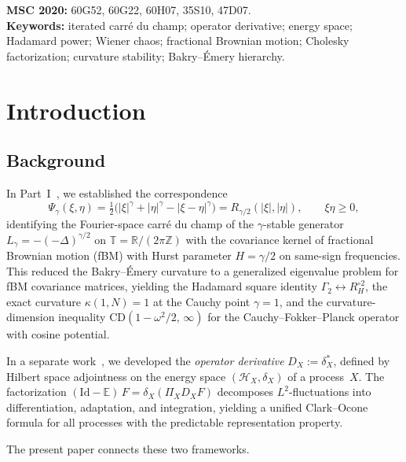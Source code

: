 \documentclass[11pt,a4paper]{article}
\theoremstyle{plain}
\theoremstyle{definition}
\theoremstyle{remark}
\newcommand{\E}{\mathbb{E}}
\newcommand{\R}{\mathbb{R}}
\newcommand{\Z}{\mathbb{Z}}
\newcommand{\T}{\mathbb{T}}
\newcommand{\Id}{\mathrm{Id}}
\begin{document}
\medskip
\noindent\textbf{MSC 2020:} 60G52, 60G22, 60H07, 35S10, 47D07.\\
\textbf{Keywords:} iterated carr\'e du champ; operator derivative;
energy space; Hadamard power; Wiener chaos;
fractional Brownian motion; Cholesky factorization;
curvature stability; Bakry--\'Emery hierarchy.


\section{Introduction}\label{sec:intro}

\subsection{Background}

In Part~I~\cite{Fontes2026b}, we established the correspondence
\begin{equation}\label{eq:part1-duality}
  \Psi_\gamma(\xi,\eta)
  = \tfrac{1}{2}\bigl(|\xi|^\gamma + |\eta|^\gamma
    - |\xi - \eta|^\gamma\bigr)
  = R_{\gamma/2}(|\xi|,|\eta|),
  \qquad \xi\eta \geq 0,
\end{equation}
identifying the Fourier-space carr\'e du champ of the
$\gamma$-stable generator $L_\gamma = -(-\Delta)^{\gamma/2}$
on $\T = \R/(2\pi\Z)$ with the covariance kernel of fractional
Brownian motion (fBM) with Hurst parameter $H = \gamma/2$ on
same-sign frequencies.  This reduced the Bakry--\'Emery curvature
to a generalized eigenvalue problem for fBM covariance matrices,
yielding the Hadamard square identity
$\Gamma_2 \leftrightarrow R_H^{\circ 2}$,
the exact curvature $\kappa(1,N) = 1$ at the Cauchy point
$\gamma = 1$, and the curvature-dimension inequality
$\mathrm{CD}(1-\omega^2/2,\,\infty)$ for the
Cauchy--Fokker--Planck operator with cosine potential.

In a separate work~\cite{Fontes2026opderiv}, we developed the
\emph{operator derivative} $D_X := \delta_X^*$, defined by
Hilbert space adjointness on the energy space $(\mathcal{H}_X,
\delta_X)$ of a process~$X$.  The factorization
$(\Id - \E)\,F = \delta_X(\Pi_X D_X F)$
decomposes $L^2$-fluctuations into differentiation, adaptation,
and integration, yielding a unified Clark--Ocone formula for
all processes with the predictable representation property.

The present paper connects these two frameworks.
\end{document}
